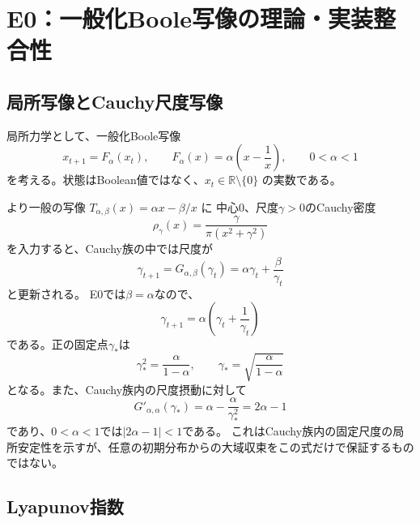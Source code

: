 \documentclass[a4paper,11pt]{jlreq}
\newcommand{\R}{\mathbb{R}}
\begin{document}
\section{E0：一般化Boole写像の理論・実装整合性}

\subsection{局所写像とCauchy尺度写像}

局所力学として、一般化Boole写像
\begin{equation}
    x_{t+1}=F_{\alpha}(x_t),
    \qquad
    F_{\alpha}(x)=\alpha\left(x-\frac{1}{x}\right),
    \qquad 0<\alpha<1
    \label{eq:boole-map}
\end{equation}
を考える。状態はBoolean値ではなく、$x_t\in\R\setminus\{0\}$ の実数である。

より一般の写像 $T_{\alpha,\beta}(x)=\alpha x-\beta/x$ に
中心0、尺度$\gamma>0$のCauchy密度
\begin{equation}
    \rho_{\gamma}(x)
    =\frac{\gamma}{\pi\left(x^2+\gamma^2\right)}
    \label{eq:cauchy-density}
\end{equation}
を入力すると、Cauchy族の中では尺度が
\begin{equation}
    \gamma_{t+1}
    =G_{\alpha,\beta}(\gamma_t)
    =\alpha\gamma_t+\frac{\beta}{\gamma_t}
    \label{eq:scale-map-general}
\end{equation}
と更新される\cite{umeno2026,umeno2016}。
E0では$\beta=\alpha$なので、
\begin{equation}
    \gamma_{t+1}
    =\alpha\left(\gamma_t+\frac{1}{\gamma_t}\right)
    \label{eq:scale-map}
\end{equation}
である。正の固定点$\gamma_{\ast}$は
\begin{equation}
    \gamma_{\ast}^2=\frac{\alpha}{1-\alpha},
    \qquad
    \gamma_{\ast}=\sqrt{\frac{\alpha}{1-\alpha}}
    \label{eq:fixed-scale}
\end{equation}
となる。また、Cauchy族内の尺度摂動に対して
\begin{equation}
    G'_{\alpha,\alpha}(\gamma_{\ast})
    =\alpha-\frac{\alpha}{\gamma_{\ast}^{2}}
    =2\alpha-1
\end{equation}
であり、$0<\alpha<1$では$|2\alpha-1|<1$である。
これはCauchy族内の固定尺度の局所安定性を示すが、任意の初期分布からの大域収束をこの式だけで保証するものではない。

\subsection{Lyapunov指数}
\end{document}
